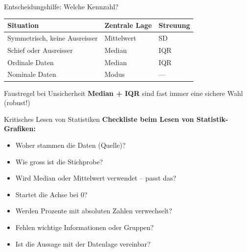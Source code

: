 \begin{frame}{Entscheidungshilfe: Welche Kennzahl?}
    \begin{table}[H]
        \centering
        \scriptsize
        \begin{tabular}{l l l}
            \toprule
            \textbf{Situation}            & \textbf{Zentrale Lage} & \textbf{Streuung} \\
            \midrule
            Symmetrisch, keine Ausreisser & Mittelwert             & \gls{SD}          \\
            Schief oder Ausreisser        & Median                 & \gls{IQR}         \\
            Ordinale Daten                & Median                 & \gls{IQR}         \\
            Nominale Daten                & Modus                  & ---               \\
            \bottomrule
        \end{tabular}
    \end{table}

    \vspace{1em}
    \begin{block}{Faustregel bei Unsicherheit}
        \textbf{Median + \gls{IQR}} sind fast immer eine sichere Wahl (robust!)
    \end{block}
\end{frame}

\begin{frame}{Kritisches Lesen von Statistiken}
    \textbf{Checkliste beim Lesen von Statistik-Grafiken:}
    \begin{itemize}[<+->]
        \item[$\square$] Woher stammen die Daten (Quelle)?
        \item[$\square$] Wie gross ist die Stichprobe?
        \item[$\square$] Wird Median oder Mittelwert verwendet -- passt das?
        \item[$\square$] Startet die Achse bei 0?
        \item[$\square$] Werden Prozente mit absoluten Zahlen verwechselt?
        \item[$\square$] Fehlen wichtige Informationen oder Gruppen?
        \item[$\square$] Ist die Aussage mit der Datenlage vereinbar?
    \end{itemize}

    \vspace{1em}
\end{frame}


